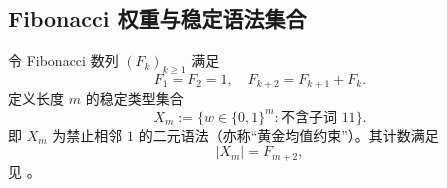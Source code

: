 \subsection{Fibonacci 权重与稳定语法集合}\label{subsec:folding-fibonacci-stable-syntax}

令 Fibonacci 数列 $(F_k)_{k\ge1}$ 满足
\[
F_1=F_2=1,\quad F_{k+2}=F_{k+1}+F_k.
\]
定义长度 $m$ 的稳定类型集合
\[
X_m:=\{w\in\{0,1\}^m:\text{不含子词 }11\}.
\]
即 $X_m$ 为禁止相邻 $1$ 的二元语法（亦称“黄金均值约束”）。其计数满足
\[
|X_m|=F_{m+2},
\]
见 \cite{LindMarcus1995}。

